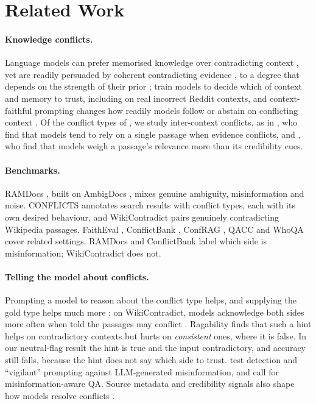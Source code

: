 \section{Related Work}
\label{sec:related}

\paragraph{Knowledge conflicts.}
Language models can prefer memorised knowledge over contradicting context \citep{longpre2021entity}, yet are readily
persuaded by coherent contradicting evidence \citep{xie2024chameleon}, to a degree that depends on the strength of
their prior \citep{wu2024clasheval}; \citet{huang2025trust} train models to decide which of context and memory to
trust, including on real incorrect Reddit contexts, and context-faithful prompting changes how readily models follow
or abstain on conflicting context \citep{zhou2023context}. Of the conflict types of \citet{xu2024survey}, we study inter-context
conflicts, as in \citet{chen2022rich}, who find that models tend to rely on a single passage when evidence conflicts,
and \citet{wan2024convincing}, who find that models weigh a passage's relevance more than its credibility cues.

\paragraph{Benchmarks.}
RAMDocs \citep{wang2025madam}, built on AmbigDocs \citep{lee2024ambigdocs}, mixes genuine ambiguity, misinformation
and noise. CONFLICTS \citep{cattan2025conflicts} annotates search results with conflict types, each with its own
desired behaviour, and WikiContradict \citep{hou2024wikicontradict} pairs genuinely contradicting Wikipedia passages.
FaithEval \citep{ming2025faitheval}, ConflictBank \citep{su2024conflictbank}, ConfRAG \citep{yuan2026confrag},
QACC \citep{liu2025qacc} and WhoQA \citep{pham2024whoqa} cover related settings. RAMDocs and ConflictBank label which side is misinformation; WikiContradict does not.

\paragraph{Telling the model about conflicts.}
Prompting a model to reason about the conflict type helps, and supplying the gold type helps much more
\citep{cattan2025conflicts}; on WikiContradict, models acknowledge both sides more often when told the passages may
conflict \citep{hou2024wikicontradict}. Ragability \citep{gross2026ragability} finds that such a hint helps on
contradictory contexts but hurts on \emph{consistent} ones, where it is false. In our neutral-flag result the hint is
true and the input contradictory, and accuracy still falls, because the hint does not say which side to trust.
\citet{pan2023risk} test detection and ``vigilant'' prompting against LLM-generated misinformation, and
\citet{pan2023attacking} call for misinformation-aware QA. Source metadata and credibility signals also shape how models resolve conflicts
\citep{chiang2024metadata,ge2025confact}.

